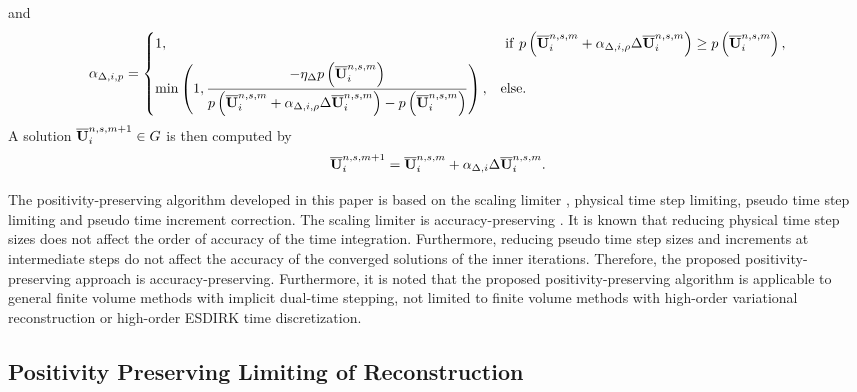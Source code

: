 and
\begin{equation}
    \alpha_{\mathrm\Delta,i,p} = \begin{dcases}
        1,                                                                                                                                                                            & \ \mathrm{if} \ p \left(\overline{\mathbf{U}}^{n,s,m}_i + \alpha_{\mathrm\Delta,i,\rho} \mathrm\Delta \overline{\mathbf{U}}_i^{n,s,m}\right) \geq  p \left(\overline{\mathbf{U}}^{n,s,m}_i\right), \\
        \min\left(1, \dfrac{-\eta_\mathrm\Delta p \left(\overline{\mathbf{U}}^{n,s,m}_i\right)}{p \left(\overline{\mathbf{U}}^{n,s,m}_i +  \alpha_{\mathrm\Delta,i,\rho} \mathrm\Delta \overline{\mathbf{U}}_i^{n,s,m}\right)-  p \left(\overline{\mathbf{U}}^{n,s,m}_i\right)} \right), &
        \mathrm{else}.
    \end{dcases}
\end{equation}
A solution $\overline{\mathbf{U}}^{n,s,m+1}_i \in G$ is then computed by
\begin{equation}
    \overline{\mathbf{U}}_i^{n,s,m+1} = \overline{\mathbf{U}}_i^{n,s,m} + \alpha_{\mathrm\Delta,i} \mathrm\Delta \overline{\mathbf{U}}_i^{n,s,m}.
\end{equation}


The positivity-preserving algorithm developed in this paper is based on the scaling limiter \cite{zhang2010positivity}, physical time step limiting, pseudo time step limiting and pseudo time increment correction. The scaling limiter is accuracy-preserving \cite{zhang2010positivity}. It is known that reducing physical time step sizes does not affect the order of accuracy of the time integration. Furthermore, reducing pseudo time step sizes and increments at intermediate steps do not affect the accuracy of the converged solutions of the inner iterations. Therefore, the proposed positivity-preserving approach is accuracy-preserving. Furthermore, it is noted that the proposed positivity-preserving algorithm is applicable to general finite volume methods with implicit dual-time stepping, not limited to finite volume methods with high-order variational reconstruction or high-order ESDIRK time discretization.

\subsection{Positivity Preserving Limiting of Reconstruction}

